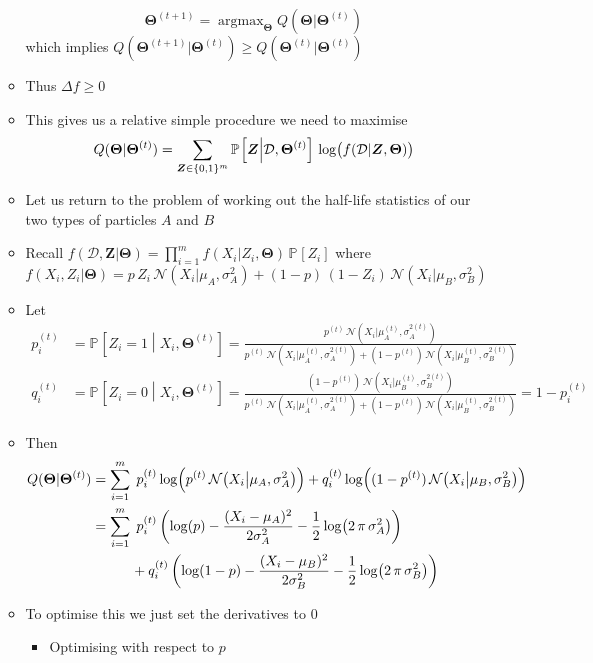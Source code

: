 \documentclass[11pt]{article}
\newcommand{\Prob}[2][]{\mathbb{P}_{#1\!}\left[ #2 \right]}
\newcommand{\logg}[1]{\log\!\left( \strut#1 \right)}
\newcommand{\normal}[2]{\mathcal{N}\!\left(#1 \big| #2 \right)}
\begin{document}
\begin{itemize}
\begin{itemize}
$$ \bm{\Theta}^{(t+1)} = \mathop{\mathrm{argmax}}_{\bm{\Theta}}
       Q(\bm{\Theta}|\bm{\Theta}^{(t)}) $$
which implies \(Q(\bm{\Theta}^{(t+1)}|\bm{\Theta}^{(t)}) \geq
       Q(\bm{\Theta}^{(t)}|\bm{\Theta}^{(t)})\)
\item Thus \(\Delta f\geq 0\)
\item This gives us a relative simple procedure we need to maximise
$$ Q(\bm{\Theta}|\bm{\Theta}^{(t)}) = \sum_{\bm{Z}\in\{0,1\}^m} \Prob{\bm{Z}\middle|\mathcal{D},\bm{\Theta}^{(t)}}\,
       \logg{f(\mathcal{D}|\bm{Z}, \bm{\Theta})} $$
\item Let us return to the problem of working out the half-life statistics of
our two types of particles \(A\) and \(B\)
\item Recall \(f(\mathcal{D},\bm{Z} |\bm{\Theta}) =
       \prod\limits_{i=1}^m  f(X_i|Z_i,\bm{\Theta}) \, \Prob{Z_i}\) where
$$ f(X_i,Z_i|\bm{\Theta}) = p\, Z_i\,\normal{X_i}{\mu_A,\sigma_A^2} +
         (1-p)\,(1-Z_i)\,\normal{X_i}{\mu_B,\sigma_B^2} $$
\item Let 
 \begin{align*}
 p_i^{(t)} &= \Prob{Z_i=1\middle|X_i, \bm{\Theta}^{(t)}} = 
 \frac{p^{(t)}\, \normal{X_i}{\mu_A^{(t)},\sigma_A^{2(t)}} }
{ p^{(t)}\,\normal{X_i}{\mu_A^{(t)},\sigma_A^{2(t)}} + (1-p^{(t)})\, \normal{X_i}{\mu_B^{(t)},\sigma_B^{2(t)}} } \\
 q_i^{(t)} &= \Prob{Z_i=0\middle|X_i, \bm{\Theta}^{(t)}} =
 \frac{(1-p^{(t)})\,\normal{X_i}{\mu_B^{(t)},\sigma_B^{2(t)}}}
{p^{(t)}\, \normal{X_i}{\mu_A^{(t)},\sigma_A^{2(t)}} + (1-p^{(t)})\, \normal{X_i}{\mu_B^{(t)},\sigma_B^{2(t)}} }
 = 1-p_i^{(t)}
 \end{align*}
\item Then
\begin{align*}
Q(\bm{\Theta}|\bm{\Theta}^{(t)}) &= \sum_{i=1}^m \;
p_i^{(t)} \logg{p^{(t)}\,\normal{X_i}{\mu_A,\sigma_A^{2}}}
+ q_i^{(t)}  \logg{(1-p^{(t)})\,\normal{X_i}{\mu_B,\sigma_B^{2}}} \\ 
&= \sum_{i=1}^m \;
p_i^{(t)}\left(\log(p) -
\frac{(X_i-\mu_A)^2}{2\sigma_A^{2}}
  - \frac{1}{2} \logg{2\,\pi\,\sigma_A^{2}} \right) \\
  &\hspace{1cm}
  + q_i^{(t)}\left(\log(1-p) -
  \frac{(X_i-\mu_B)^2}{2\sigma_B^{2}}
  - \frac{1}{2} \logg{2\,\pi\,\sigma_B^{2}} \right) 
  \end{align*}
\item To optimise this we just set the derivatives to 0
\begin{itemize}
\item Optimising with respect to \(p\)

\end{itemize}
\end{itemize}
\end{itemize}
\end{document}
